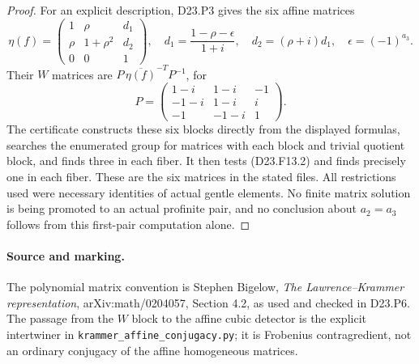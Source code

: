 \begin{proof}
For an explicit description, D23.P3 gives the six affine
matrices
\[
 \eta(f)=\begin{pmatrix}
 1&\rho&d_1\\
 \rho&1+\rho^2&d_2\\
 0&0&1
 \end{pmatrix},\quad
 d_1=\frac{1-\rho-\epsilon}{1+i},\quad
 d_2=(\rho+i)d_1,\quad \epsilon=(-1)^{a_3}.
\]
Their $W$ matrices are
$P\,\overline{\eta(f)}^{-T}P^{-1}$, for
\[
 P=\begin{pmatrix}1-i&1-i&-1\\-1-i&1-i&i\\-1&-1-i&1\end{pmatrix}.
\]
The certificate constructs these six blocks directly from
the displayed formulas, searches the enumerated group for
matrices with each block and trivial quotient block, and
finds three in each fiber.  It then tests (D23.F13.2) and
finds precisely one in each fiber.  These are the six
matrices in the stated files.  All restrictions used were
necessary identities of actual gentle elements.  No finite
matrix solution is being promoted to an actual profinite
pair, and no conclusion about $a_2=a_3$ follows from this
first-pair computation alone.
\end{proof}

\paragraph{Source and marking.}
The polynomial matrix convention is Stephen Bigelow,
\emph{The Lawrence--Krammer representation}, arXiv:math/0204057,
Section 4.2, as used and checked in D23.P6.  The passage
from the $W$ block to the affine cubic detector is the
explicit intertwiner in
\texttt{krammer\_affine\_conjugacy.py}; it is Frobenius
contragredient, not an ordinary conjugacy of the affine
homogeneous matrices.
